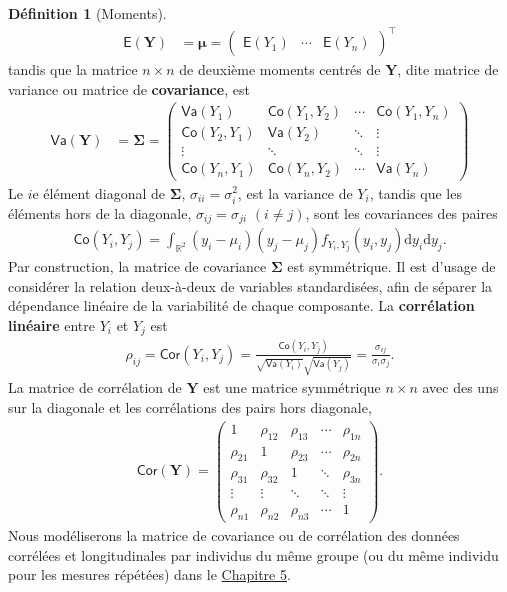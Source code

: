 \documentclass[
  11pt,
  letterpaper,
]{scrbook}
\theoremstyle{definition}
\newtheorem{definition}{Définition}[chapter]
\theoremstyle{definition}
\theoremstyle{remark}
\begin{document}
\begin{definition}[Moments]
\begin{align*}
\mathsf{E}(\boldsymbol{Y}) &= \boldsymbol{\mu}=
\begin{pmatrix}
\mathsf{E}(Y_1) &
\cdots  &
\mathsf{E}(Y_n)
\end{pmatrix}^\top
\end{align*} tandis que la matrice \(n \times n\) de deuxième moments
centrés de \(\boldsymbol{Y}\), dite matrice de variance ou matrice de
\textbf{covariance}, est \begin{align*}
\mathsf{Va}(\boldsymbol{Y}) &= \boldsymbol{\Sigma} = \begin{pmatrix} \mathsf{Va}(Y_1) & \mathsf{Co}(Y_1, Y_2)  & \cdots & \mathsf{Co}(Y_1, Y_n) \\
\mathsf{Co}(Y_2, Y_1) & \mathsf{Va}(Y_2) & \ddots & \vdots \\
\vdots & \ddots & \ddots & \vdots \\
\mathsf{Co}(Y_n, Y_1) & \mathsf{Co}(Y_n, Y_2) &\cdots & \mathsf{Va}(Y_n)
\end{pmatrix}
\end{align*} Le \(i\)e élément diagonal de \(\boldsymbol{\Sigma}\),
\(\sigma_{ii}=\sigma_i^2\), est la variance de \(Y_i\), tandis que les
éléments hors de la diagonale, \(\sigma_{ij}=\sigma_{ji}\)
\((i \neq j)\), sont les covariances des paires \begin{align*}
\mathsf{Co}(Y_i, Y_j) = \int_{\mathbb{R}^2} (y_i-\mu_i)(y_j-\mu_j) f_{Y_i, Y_j}(y_i, y_j) \mathrm{d} y_i \mathrm{d} y_j.
\end{align*} Par construction, la matrice de covariance
\(\boldsymbol{\Sigma}\) est symmétrique. Il est d'usage de considérer la
relation deux-à-deux de variables standardisées, afin de séparer la
dépendance linéaire de la variabilité de chaque composante. La
\textbf{corrélation linéaire} entre \(Y_i\) et \(Y_j\) est
\begin{align*}
\rho_{ij}=\mathsf{Cor}(Y_i,Y_j)=\frac{\mathsf{Co}(Y_i, Y_j)}{\sqrt{\mathsf{Va}(Y_i)}\sqrt{\mathsf{Va}(Y_j)}}=\frac{\sigma_{ij}}{\sigma_i\sigma_j}.
\end{align*} La matrice de corrélation de \(\boldsymbol{Y}\) est une
matrice symmétrique \(n\times n\) avec des uns sur la diagonale et les
corrélations des pairs hors diagonale, \begin{align*}
\mathsf{Cor}(\boldsymbol{Y})=
\begin{pmatrix}
1 & \rho_{12} & \rho_{13} & \cdots & \rho_{1n}\\
\rho_{21} & 1 & \rho_{23} & \cdots & \rho_{2n} \\
\rho_{31} & \rho_{32} & 1 & \ddots & \rho_{3n} \\
\vdots & \vdots & \ddots & \ddots & \vdots \\
\rho_{n1} & \rho_{n2} & \rho_{n3} & \cdots & 1
\end{pmatrix}.
\end{align*} Nous modéliserons la matrice de covariance ou de
corrélation des données corrélées et longitudinales par individus du
même groupe (ou du même individu pour les mesures répétées) dans le
\href{donnees-longitudinales-correlees}{Chapitre 5}.

\end{definition}
\end{document}
